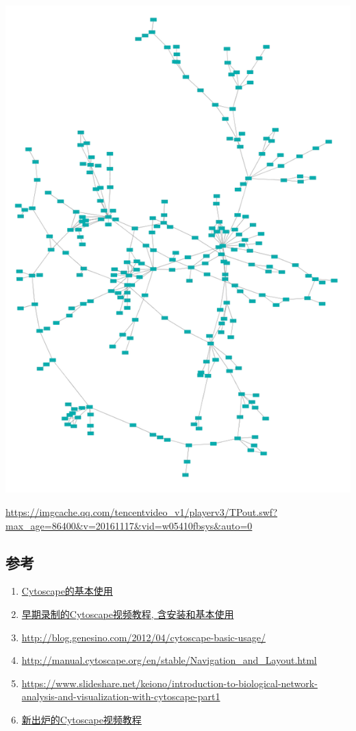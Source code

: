 \documentclass[]{article}
\providecommand{\tightlist}{%
  \setlength{\itemsep}{0pt}\setlength{\parskip}{0pt}}
\numberwithin{figure}{section}
\numberwithin{table}{section}
\theoremstyle{definition}
\theoremstyle{definition}
\theoremstyle{definition}
\theoremstyle{remark}
\begin{document}
\begin{center}\includegraphics[width=0.95\linewidth,height=0.7\textheight,keepaspectratio]{images/yOrganic} \end{center}

\url{https://imgcache.qq.com/tencentvideo_v1/playerv3/TPout.swf?max_age=86400\&v=20161117\&vid=w05410fbsys\&auto=0}

\subsection{参考}\label{-1}

\begin{enumerate}
\def\labelenumi{\arabic{enumi}.}
\tightlist
\item
  \href{http://mp.weixin.qq.com/s/ZSoW7-qWs3BuSB7bkDnfmA}{Cytoscape的基本使用}
\item
  \href{http://mp.weixin.qq.com/s/Q30mdC26UqffBcbtFxpnXg}{早期录制的Cytoscape视频教程,
  含安装和基本使用}
\item
  \url{http://blog.genesino.com/2012/04/cytoscape-basic-usage/}
\item
  \url{http://manual.cytoscape.org/en/stable/Navigation_and_Layout.html}
\item
  \url{https://www.slideshare.net/keiono/introduction-to-biological-network-analysis-and-visualization-with-cytoscape-part1}
\item
  \href{http://mp.weixin.qq.com/s?__biz=MzI5MTcwNjA4NQ==\&mid=2247484194\&idx=1\&sn=61bcbe1c48e195c5c830396865789723\&chksm=ec0dc6a8db7a4fbeaa9cdd7245127edd382f3e4d13a61636c2cbc52062b32d7565bf282fca5e\#rd}{新出炉的Cytoscape视频教程}
\end{enumerate}
\end{document}
